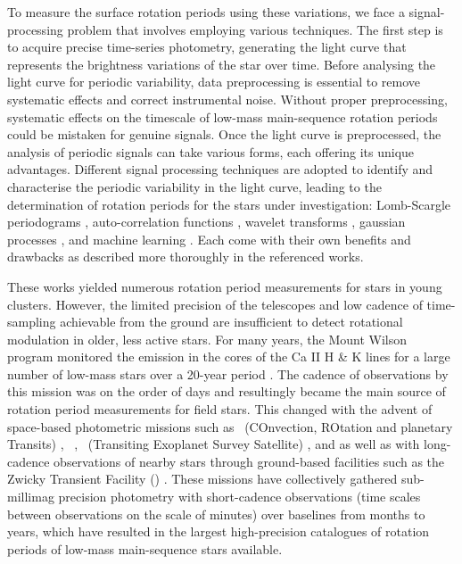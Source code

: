 To measure the surface rotation periods using these variations, we face a signal-processing problem that involves employing various techniques. 
The first step is to acquire precise time-series photometry, generating the light curve that represents the brightness variations of the star over time.
Before analysing the light curve for periodic variability, data preprocessing is essential to remove systematic effects and correct instrumental noise. 
Without proper preprocessing, systematic effects on the timescale of low-mass main-sequence rotation periods could be mistaken for genuine signals.
Once the light curve is preprocessed, the analysis of periodic signals can take various forms, each offering its unique advantages. 
Different signal processing techniques are adopted to identify and characterise the periodic variability in the light curve, leading to the determination of rotation periods for the stars under investigation: Lomb-Scargle periodograms \citep[see, e.g.,][]{lomb_least_1976, scargle_studies_1982,mottola_slow_1995,scott_photometric_1992,reinhold_fast_2013,reinhold_rotation_2013}, auto-correlation functions \citep[see, e.g.,][]{aigrain_transiting_2008,garcia_rotation_2014,mcquillan_rotation_2014}, wavelet transforms \citep[see, e.g.,][]{garcia_rotation_2014}, gaussian processes \citep[see, e.g.,][]{angus_inferring_2017}, and machine learning \citep[see, e.g.,][]{claytor_recovery_2022}.
Each come with their own benefits and drawbacks as described more thoroughly in the referenced works.

These works yielded numerous rotation period measurements for stars in young clusters.
However, the limited precision of the telescopes and low cadence of time-sampling achievable from the ground are insufficient to detect rotational modulation in older, less active stars.
For many years, the Mount Wilson program monitored the emission in the cores of the Ca II H \& K lines for a large number of low-mass stars over a 20-year period \citep{wilson_probable_1963}.
The cadence of observations by this mission was on the order of days and resultingly became the main source of rotation period measurements for field stars.
This changed with the advent of space-based photometric missions such as \corot \ (COnvection, ROtation and planetary Transits) \citep{baglin_corot_2003}, \kepler \ \citep{borucki_kepler_2010, howell_k2_2014}, \tess \ (Transiting Exoplanet Survey Satellite) \citep{ricker_transiting_2014}, and \gaia{} \citep{distefano_gaia_2022} as well as with long-cadence observations of nearby stars through ground-based facilities such as the Zwicky Transient Facility (\ZTF) \citep{lu_bridging_2022}.
These missions have collectively gathered sub-millimag precision photometry with short-cadence observations (time scales between observations on the scale of minutes) over baselines from months to years, which have resulted in the largest high-precision catalogues of rotation periods of low-mass main-sequence stars available.

